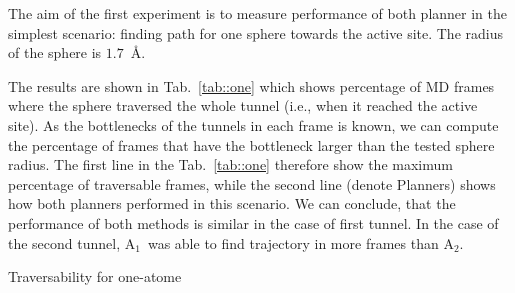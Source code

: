 \documentclass[usletter, 10pt, conference]{ieeeconf} %
\def\LA{L_1}
\def\LB{L_2}
\def\RA{A$_{1}$}
\def\RB{A$_{2}$}
\begin{document}
The aim of the first experiment is to measure performance of both planner in the simplest scenario: finding path for one sphere towards the active site.
The radius of the sphere is $1.7$~\AA. 

The results are shown in Tab.~\ref{tab::one} which shows percentage of MD frames where the sphere traversed the whole tunnel 
(i.e., when it reached the active site).
As the bottlenecks of the tunnels in each frame is known, we can compute the percentage of frames that have the bottleneck larger
than the tested sphere radius.
The first line in the Tab.~\ref{tab::one} therefore show the maximum percentage of traversable frames, while the second
line (denote Planners) shows how both planners performed in this scenario.
We can conclude, that the performance of both methods is similar in the case of first tunnel.
In the case of the second tunnel, \RA\ was able to find trajectory in more frames than \RB.

\begin{table}
\centering
\caption{\label{tab::one}Traversability for one-atome}
\small
\renewcommand{\tabcolsep}{3.5pt}
{\small

}
\end{table}


%
%





%
\end{document}
